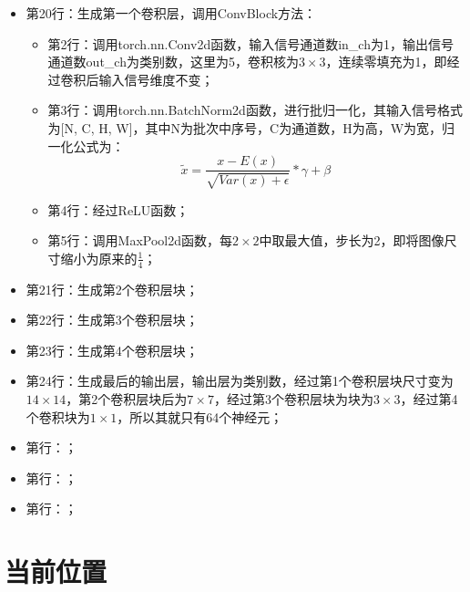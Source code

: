 \begin{itemize}
\item 第20行：生成第一个卷积层，调用ConvBlock方法：
	\begin{itemize}
	\item 第2行：调用torch.nn.Conv2d函数，输入信号通道数in\_ch为1，输出信号通道数out\_ch为类别数，这里为5，卷积核为$3 \times 3$，连续零填充为1，即经过卷积后输入信号维度不变；
	\item 第3行：调用torch.nn.BatchNorm2d函数，进行批归一化，其输入信号格式为[N, C, H, W]，其中N为批次中序号，C为通道数，H为高，W为宽，归一化公式为：
\begin{equation}
\tilde{x} = \frac{x-E(x)}{ \sqrt{ Var(x) + \epsilon } } * \gamma + \beta
\label{e0301-batch-norm-2d-formula}
\end{equation}
	\item 第4行：经过ReLU函数；
	\item 第5行：调用MaxPool2d函数，每$2 \times 2$中取最大值，步长为2，即将图像尺寸缩小为原来的$\frac{1}{4}$；
	\end{itemize}
\item 第21行：生成第2个卷积层块；
\item 第22行：生成第3个卷积层块；
\item 第23行：生成第4个卷积层块；
\item 第24行：生成最后的输出层，输出层为类别数，经过第1个卷积层块尺寸变为$14 \times 14$，第2个卷积层块后为$7 \times 7$，经过第3个卷积层块为块为$3 \times 3$，经过第4个卷积块为$1 \times 1$，所以其就只有64个神经元；
\item 第行：；
\item 第行：；
\item 第行：；
\end{itemize}

\section{当前位置}





